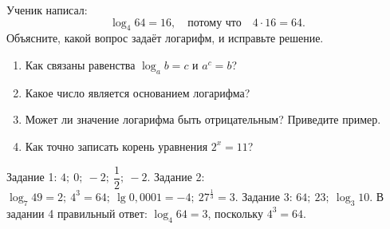 \begin{practicebox}
  Ученик написал:
  \[
    \log_4 64=16,
    \quad\text{потому что}\quad 4\cdot16=64.
  \]
  Объясните, какой вопрос задаёт логарифм, и исправьте решение.
\end{practicebox}

\begin{questionsbox}
  \begin{enumerate}
    \item Как связаны равенства \(\log_a b=c\) и \(a^c=b\)?
    \item Какое число является основанием логарифма?
    \item Может ли значение логарифма быть отрицательным? Приведите пример.
    \item Как точно записать корень уравнения \(2^x=11\)?
  \end{enumerate}
\end{questionsbox}

\begin{notebox}
  Задание 1: \(4;\ 0;\ -2;\ \dfrac12;\ -2\).
  Задание 2: \(\log_7 49=2;\ 4^3=64;\
    \lg0{,}0001=-4;\ 27^{\frac13}=3\).
  Задание 3: \(64;\ 23;\ \log_3 10\).
  В задании 4 правильный ответ: \(\log_4 64=3\), поскольку \(4^3=64\).
\end{notebox}
